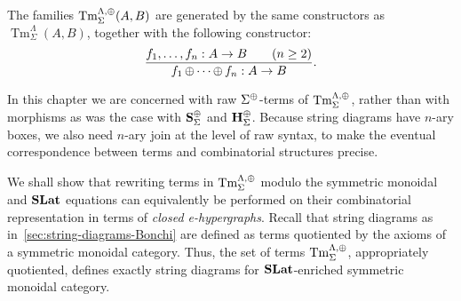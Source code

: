 \begin{definition}
The families
$\operatorname{Tm}^{\Lambda,\operatorname{\oplus}}_{\Sigma}(A,B)$
are generated by the same constructors as
$\operatorname{Tm}^{\Lambda}_{\Sigma}(A,B)$, together with
the following constructor:
\[
  \frac{f_1,\ldots,f_n : A \to B \qquad (n \geq 2)}
       {f_1 \operatorname{\oplus} \cdots \operatorname{\oplus} f_n : A \to B}.
\]
\end{definition}
\begin{remark}
In this chapter we are concerned with raw $\Sigma^{\operatorname{\oplus}}$-terms of $\operatorname{Tm}^{\Lambda, \operatorname{\oplus}}_{\Sigma}$, rather than with morphisms as was the case with $\mathbf{S}^{\operatorname{\oplus}}_{\Sigma}$ and $\mathbf{H}^{\operatorname{\oplus}}_{\Sigma}$.
Because string diagrams have $n$-ary boxes, we also need $n$-ary join at the level of raw syntax, to make the eventual correspondence between terms and combinatorial structures precise.
\end{remark}

We shall show that rewriting terms in
$\operatorname{Tm}_{\Sigma}^{\Lambda,\operatorname{\oplus}}$ modulo the symmetric monoidal
and $\mathbf{SLat}$ equations can equivalently be performed on their
combinatorial representation in terms of \emph{closed e-hypergraphs}.
Recall that string diagrams as in~\cref{sec:string-diagrams-Bonchi} are defined as terms quotiented by the axioms of a symmetric monoidal category.
Thus, the set of terms $\operatorname{Tm}^{\Lambda, \operatorname{\oplus}}_{\Sigma}$, appropriately quotiented, defines exactly string diagrams for $\mathbf{SLat}$-enriched symmetric monoidal category. 

